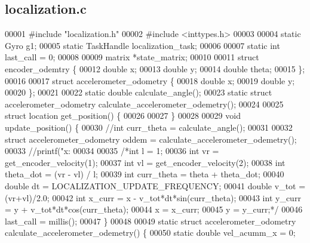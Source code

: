 \subsection{localization.\+c}
\label{localization_8c_source}

\begin{DoxyCode}
00001 \textcolor{preprocessor}{#include "localization.h"}
00002 \textcolor{preprocessor}{#include <inttypes.h>}
00003 
00004 \textcolor{keyword}{static} Gyro g1;
00005 \textcolor{keyword}{static} TaskHandle localization_task;
00006 
00007 \textcolor{keyword}{static} \textcolor{keywordtype}{int} last_call = 0;
00008 
00009 matrix *state_matrix;
00010 
00011 \textcolor{keyword}{struct }encoder_odemtry \{
00012   \textcolor{keywordtype}{double} x;
00013   \textcolor{keywordtype}{double} y;
00014   \textcolor{keywordtype}{double} theta;
00015 \};
00016 
00017 \textcolor{keyword}{struct }accelerometer_odometry \{
00018   \textcolor{keywordtype}{double} x;
00019   \textcolor{keywordtype}{double} y;
00020 \};
00021 
00022 \textcolor{keyword}{static} \textcolor{keywordtype}{double} calculate_angle();
00023 \textcolor{keyword}{static} \textcolor{keyword}{struct }accelerometer_odometry calculate_accelerometer_odemetry();
00024 
00025 \textcolor{keyword}{struct }location get_position() \{
00026 
00027 \}
00028 
00029 \textcolor{keywordtype}{void} update_position() \{
00030   \textcolor{comment}{//int curr\_theta = calculate\_angle();}
00031 
00032   \textcolor{keyword}{struct }accelerometer_odometry oddem = calculate_accelerometer_odemetry();
00033   \textcolor{comment}{//printf("x: %
00034 
00035   \textcolor{comment}{/*int l = 1;}
00036 \textcolor{comment}{  int vr = get\_encoder\_velocity(1);}
00037 \textcolor{comment}{  int vl = get\_encoder\_velocity(2);}
00038 \textcolor{comment}{  int theta\_dot = (vr - vl) / l;}
00039 \textcolor{comment}{  int curr\_theta = theta + theta\_dot;}
00040 \textcolor{comment}{  double dt = LOCALIZATION\_UPDATE\_FREQUENCY;}
00041 \textcolor{comment}{  double v\_tot = (vr+vl)/2.0;}
00042 \textcolor{comment}{  int x\_curr = x - v\_tot*dt*sin(curr\_theta);}
00043 \textcolor{comment}{  int y\_curr = y + v\_tot*dt*cos(curr\_theta);}
00044 \textcolor{comment}{  x = x\_curr;}
00045 \textcolor{comment}{  y = y\_curr;*/}
00046   last_call = millis();
00047 \}
00048 
00049 \textcolor{keyword}{static} \textcolor{keyword}{struct }accelerometer_odometry calculate_accelerometer_odemetry() \{
00050   \textcolor{keyword}{static} \textcolor{keywordtype}{double} vel\_acumm\_x = 0;
}
\end{DoxyCode}
